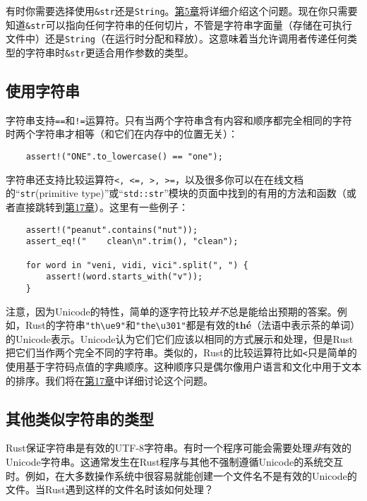 有时你需要选择使用\texttt{\&str}还是\texttt{String}。\hyperref[ch05]{第5章}将详细介绍这个问题。现在你只需要知道\texttt{\&str}可以指向任何字符串的任何切片，不管是字符串字面量（存储在可执行文件中）还是\texttt{String}（在运行时分配和释放）。这意味着当允许调用者传递任何类型的字符串时\texttt{\&str}更适合用作参数的类型。

\subsection{使用字符串}

字符串支持\texttt{==}和\texttt{!=}运算符。只有当两个字符串含有内容和顺序都完全相同的字符时两个字符串才相等（和它们在内存中的位置无关）：
\begin{verbatim}
    assert!("ONE".to_lowercase() == "one");
\end{verbatim}

字符串还支持比较运算符\texttt{<, <=, >, >=}，以及很多你可以在在线文档的“\texttt{str}(primitive type)”或“\texttt{std::str}”模块的页面中找到的有用的方法和函数（或者直接跳转到\hyperref[ch17]{第17章}）。这里有一些例子：
\begin{verbatim}
    assert!("peanut".contains("nut"));
    assert_eq!("    clean\n".trim(), "clean");

    for word in "veni, vidi, vici".split(", ") {
        assert!(word.starts_with("v"));
    }
\end{verbatim}

注意，因为Unicode的特性，简单的逐字符比较\emph{并不}总是能给出预期的答案。例如，Rust的字符串\texttt{"th\textbackslash u{e9}"}和\texttt{"the\textbackslash u{301}"}都是有效的\textbf{thé}（法语中表示茶的单词）的Unicode表示。Unicode认为它们它们应该以相同的方式展示和处理，但是Rust把它们当作两个完全不同的字符串。类似的，Rust的比较运算符比如\texttt{<}只是简单的使用基于字符码点值的字典顺序。这种顺序只是偶尔像用户语言和文化中用于文本的排序。我们将在\hyperref[ch17]{第17章}中详细讨论这个问题。

\subsection{其他类似字符串的类型}

Rust保证字符串是有效的UTF-8字符串。有时一个程序可能会需要处理\emph{非}有效的Unicode字符串。这通常发生在Rust程序与其他不强制遵循Unicode的系统交互时。例如，在大多数操作系统中很容易就能创建一个文件名不是有效的Unicode的文件。当Rust遇到这样的文件名时该如何处理？

